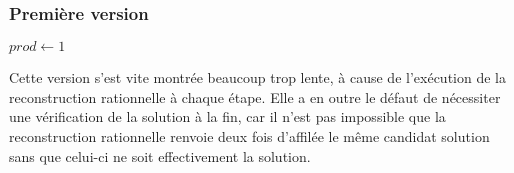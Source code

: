 \documentclass[french]{article}
\begin{document}
\subsubsection{Première version} \label{subsubsec:modalg1}
\begin{algorithm}[H]
	\DontPrintSemicolon
	$prod \gets 1$
\end{algorithm}
\leavevmode \par
Cette version s'est vite montrée beaucoup trop lente, à cause de l'exécution de la reconstruction rationnelle à chaque étape. Elle a en outre le défaut de nécessiter une vérification de la solution à la fin, car il n'est pas impossible que la reconstruction rationnelle renvoie deux fois d'affilée le même candidat solution sans que celui-ci ne soit effectivement la solution.
\end{document}

